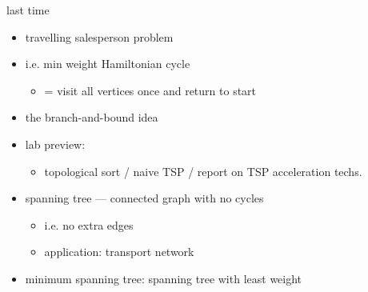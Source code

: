 \begin{frame}{last time}
    \begin{itemize}
    \item travelling salesperson problem
    \item i.e. min weight Hamiltonian cycle
        \begin{itemize}
        \item = visit all vertices once and return to start
        \end{itemize}
    \item the branch-and-bound idea
    \item lab preview:
        \begin{itemize}
        \item topological sort / naive TSP / report on TSP acceleration techs.
        \end{itemize}
    \item spanning tree --- connected graph with no cycles
        \begin{itemize}
        \item i.e. no extra edges
        \item application: transport network
        \end{itemize}
    \item minimum spanning tree: spanning tree with least weight
    \end{itemize}
\end{frame}
